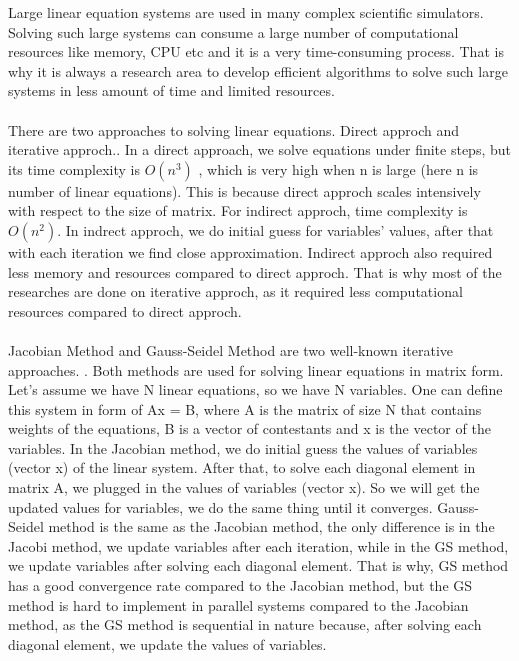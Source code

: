 \documentclass[11pt]{article}       %
\begin{document}
Large linear equation systems are used in many complex scientific simulators. Solving such large systems can consume a large number of computational resources like memory, CPU etc and it is a very time-consuming process. That is why it is always a research area to develop efficient algorithms to solve such large systems in less amount of time and limited resources.
\\
\\There are two approaches to solving linear equations. Direct approch and iterative approch.. In a direct approach, we solve equations under finite steps, but its time complexity is $O(n^{3})$ \cite{numerical-mathematics}, which is very high when n is large (here n is number of linear equations). This is because direct approch scales intensively with respect to the size of matrix. For indirect approch, time complexity is $O(n^{2})$. In indrect approch, we do initial guess for variables' values, after that with each iteration we find close approximation. Indirect approch also required less memory and resources compared to direct approch. That is why most of the researches are done on iterative approch, as it required less computational resources compared to direct approch.
\\
\\Jacobian Method and Gauss-Seidel Method are two well-known iterative approaches. \cite{hageman2016applied}. Both methods are used for solving linear equations in matrix form. Let's assume we have N linear equations, so we have N variables. One can define this system in form of Ax = B, where A is the matrix of size N that contains weights of the equations, B is a vector of contestants and x is the vector of the variables. In the Jacobian method, we do initial guess the values of variables (vector x) of the linear system. After that,  to solve each diagonal element in matrix A, we plugged in the values of variables (vector x). So we will get the updated values for variables, we do the same thing until it converges. Gauss-Seidel method is the same as the Jacobian method, the only difference is in the Jacobi method, we update variables after each iteration, while in the GS method, we update variables after solving each diagonal element. That is why, GS method has a good convergence rate compared to the Jacobian method, but the GS method is hard to implement in parallel systems compared to the Jacobian method, as the GS method is sequential in nature because, after solving each diagonal element, we update the values of variables.
\\
\end{document}
